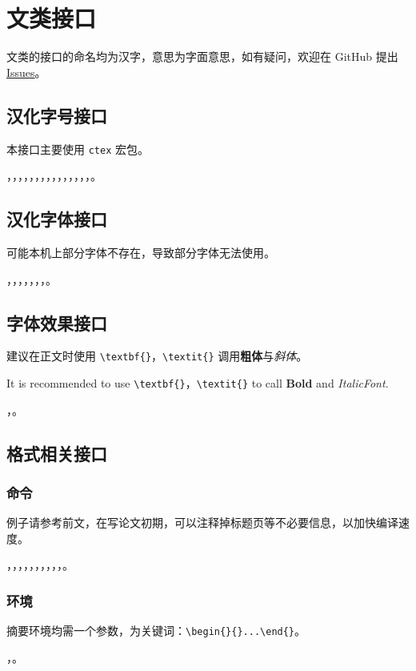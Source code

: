 \section{文类接口}
文类的接口的命名均为汉字，意思为字面意思，如有疑问，欢迎在 GitHub 提出 \href{https://github.com/Iydon/sustechthesis/issues}{Issues}。

\subsection{汉化字号接口}
本接口主要使用 \texttt{ctex} 宏包。

，，，，，，，，，，，，，，，。


\subsection{汉化字体接口}
可能本机上部分字体不存在，导致部分字体无法使用。

，，，，，，，。


\subsection{字体效果接口}

建议在正文时使用 \verb|\textbf{}|，\verb|\textit{}| 调用\textbf{粗体}与\textit{斜体}。

It is recommended to use \verb|\textbf{}|，\verb|\textit{}| to call \textbf{Bold} and \textit{ItalicFont}.

，。


\subsection{格式相关接口}
\subsubsection{命令}
例子请参考前文，在写论文初期，可以注释掉标题页等不必要信息，以加快编译速度。

，，，，，，，，，，。

\subsubsection{环境}
摘要环境均需一个参数，为关键词：\verb|\begin{}{}...\end{}|。

，。
